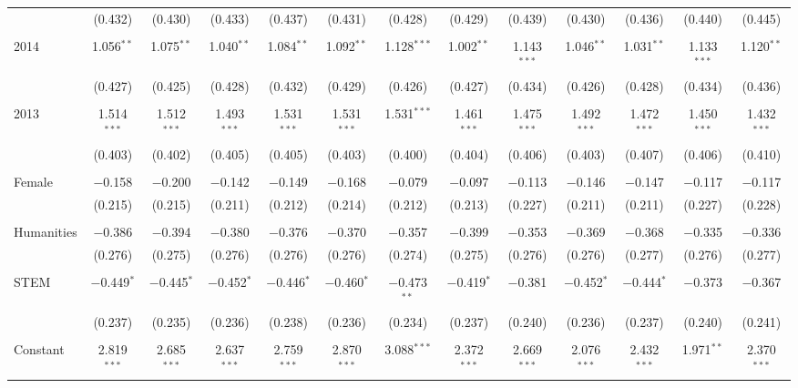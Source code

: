 \begin{table}[H]
\begin{adjustbox}{width=\textwidth}
\begin{tabular}{@{\extracolsep{5pt}}lcccccccccccc}
  & (0.432) & (0.430) & (0.433) & (0.437) & (0.431) & (0.428) & (0.429) & (0.439) & (0.430) & (0.436) & (0.440) & (0.445) \\ 
  & & & & & & & & & & & & \\ 
 2014 & 1.056$^{**}$ & 1.075$^{**}$ & 1.040$^{**}$ & 1.084$^{**}$ & 1.092$^{**}$ & 1.128$^{***}$ & 1.002$^{**}$ & 1.143$^{***}$ & 1.046$^{**}$ & 1.031$^{**}$ & 1.133$^{***}$ & 1.120$^{**}$ \\ 
  & (0.427) & (0.425) & (0.428) & (0.432) & (0.429) & (0.426) & (0.427) & (0.434) & (0.426) & (0.428) & (0.434) & (0.436) \\ 
  & & & & & & & & & & & & \\ 
 2013 & 1.514$^{***}$ & 1.512$^{***}$ & 1.493$^{***}$ & 1.531$^{***}$ & 1.531$^{***}$ & 1.531$^{***}$ & 1.461$^{***}$ & 1.475$^{***}$ & 1.492$^{***}$ & 1.472$^{***}$ & 1.450$^{***}$ & 1.432$^{***}$ \\ 
  & (0.403) & (0.402) & (0.405) & (0.405) & (0.403) & (0.400) & (0.404) & (0.406) & (0.403) & (0.407) & (0.406) & (0.410) \\ 
  & & & & & & & & & & & & \\ 
 Female & $-$0.158 & $-$0.200 & $-$0.142 & $-$0.149 & $-$0.168 & $-$0.079 & $-$0.097 & $-$0.113 & $-$0.146 & $-$0.147 & $-$0.117 & $-$0.117 \\ 
  & (0.215) & (0.215) & (0.211) & (0.212) & (0.214) & (0.212) & (0.213) & (0.227) & (0.211) & (0.211) & (0.227) & (0.228) \\ 
  & & & & & & & & & & & & \\ 
 Humanities & $-$0.386 & $-$0.394 & $-$0.380 & $-$0.376 & $-$0.370 & $-$0.357 & $-$0.399 & $-$0.353 & $-$0.369 & $-$0.368 & $-$0.335 & $-$0.336 \\ 
  & (0.276) & (0.275) & (0.276) & (0.276) & (0.276) & (0.274) & (0.275) & (0.276) & (0.276) & (0.277) & (0.276) & (0.277) \\ 
  & & & & & & & & & & & & \\ 
 STEM & $-$0.449$^{*}$ & $-$0.445$^{*}$ & $-$0.452$^{*}$ & $-$0.446$^{*}$ & $-$0.460$^{*}$ & $-$0.473$^{**}$ & $-$0.419$^{*}$ & $-$0.381 & $-$0.452$^{*}$ & $-$0.444$^{*}$ & $-$0.373 & $-$0.367 \\ 
  & (0.237) & (0.235) & (0.236) & (0.238) & (0.236) & (0.234) & (0.237) & (0.240) & (0.236) & (0.237) & (0.240) & (0.241) \\ 
  & & & & & & & & & & & & \\ 
 Constant & 2.819$^{***}$ & 2.685$^{***}$ & 2.637$^{***}$ & 2.759$^{***}$ & 2.870$^{***}$ & 3.088$^{***}$ & 2.372$^{***}$ & 2.669$^{***}$ & 2.076$^{***}$ & 2.432$^{***}$ & 1.971$^{**}$ & 2.370$^{***}$ \\ 

\end{tabular}
\end{adjustbox}
\end{table}
